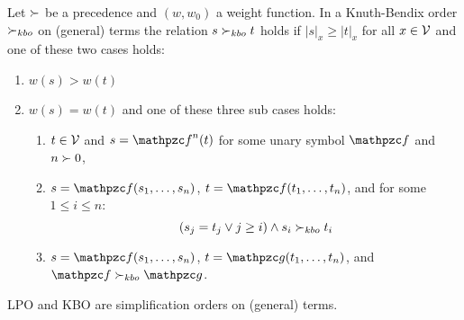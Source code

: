 \begin{definition}[KBO]\label{def:kbo}
	Let $\succ$ be a precedence and $(w,w_0)$ a weight function.
	In a Knuth-Bendix order $\succ_{kbo}$ on (general) terms the relation $s\succ_{kbo} t$ holds if
	$|s|_x\geq|t|_x$ for all $x\in{\mathcal V}$ and one of these two cases holds:
	\begin{enumerate}
		\item $w(s) > w(t)$
		\item $w(s) = w(t)$ and one of these three sub cases holds:
		\begin{enumerate}
			\item $t\in{\mathcal V}$ and $s=\mcf^n(t)$ for some unary symbol $\mcf$ and $n\succ0$,
			\item $s=\mcf(s_1,\ldots,s_n)$, $t=\mcf(t_1,\ldots,t_n)$, and for some $1\leq i\leq n$:
			\[
			(s_j=t_j \lor j\geq i) \land s_i\succ_{kbo} t_i
			\]
			\item $s=\mcf(s_1,\ldots,s_n)$, $t=\mcg(t_1,\ldots,t_n)$, and $\mcf\gtpre_{kbo}\mcg$.
		\end{enumerate}
	\end{enumerate}
\end{definition}

\begin{lemma}
	LPO and KBO are simplification orders on (general) terms.
\end{lemma}

